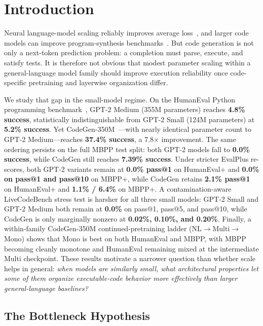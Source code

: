 \documentclass[preprint,12pt,authoryear]{elsarticle}
\begin{document}
\section{Introduction}

Neural language-model scaling reliably improves average loss~\cite{kaplan2020scaling,hoffmann2022training}, and larger code models can improve program-synthesis benchmarks~\cite{austin2021program}. But code generation is not only a next-token prediction problem: a completion must parse, execute, and satisfy tests. It is therefore not obvious that modest parameter scaling within a general-language model family should improve execution reliability once code-specific pretraining and layerwise organization differ.

We study that gap in the small-model regime. On the HumanEval Python programming benchmark~\cite{chen2021humaneval}, GPT-2 Medium (355M parameters) reaches \textbf{4.8\% success}, statistically indistinguishable from GPT-2 Small (124M parameters) at \textbf{5.2\% success}. Yet CodeGen-350M~\cite{nijkamp2022codegen}---with nearly identical parameter count to GPT-2 Medium---reaches \textbf{37.4\% success}, a 7.8$\times$ improvement. The same ordering persists on the full MBPP test split: both GPT-2 models fall to \textbf{0.0\% success}, while CodeGen still reaches \textbf{7.39\% success}. Under stricter EvalPlus re-scores, both GPT-2 variants remain at \textbf{0.0\% pass@1} on HumanEval+ and \textbf{0.0\% on pass@1 and pass@10} on MBPP+, while CodeGen retains \textbf{2.1\% pass@1} on HumanEval+ and \textbf{1.1\% / 6.4\%} on MBPP+. A contamination-aware LiveCodeBench stress test is harsher for all three small models: GPT-2 Small and GPT-2 Medium both remain at \textbf{0.0\%} on pass@1, pass@5, and pass@10, while CodeGen is only marginally nonzero at \textbf{0.02\%, 0.10\%, and 0.20\%}. Finally, a within-family CodeGen-350M continued-pretraining ladder (NL$\rightarrow$Multi$\rightarrow$Mono) shows that Mono is best on both HumanEval and MBPP, with MBPP becoming cleanly monotone and HumanEval remaining mixed at the intermediate Multi checkpoint. These results motivate a narrower question than whether scale helps in general: \emph{when models are similarly small, what architectural properties let some of them organize executable-code behavior more effectively than larger general-language baselines?}

\subsection{The Bottleneck Hypothesis}
\end{document}
